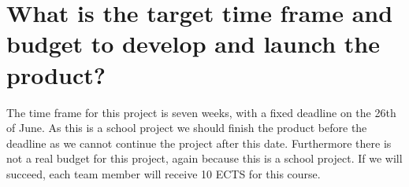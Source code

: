 \section{What is the target time frame and budget to develop and launch the product?}
The time frame for this project is seven weeks, with a fixed deadline on the 26th of June.
As this is a school project we should finish the product before the deadline as we cannot continue the project after this date.
Furthermore there is not a real budget for this project, again because this is a school project. If we will succeed, each team member will receive 10 ECTS for this course.